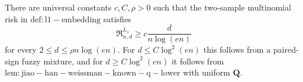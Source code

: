 There are universal constants \(c,C,\rho>0\) such that the two-sample multinomial risk in \(\mathrm{def:l1-embedding}\) satisfies
\[
 \mathfrak R^{L_1}_{n,d}\ge c\frac{d}{n\log(en)}
\]
for every \(2\le d\le\rho n\log(en)\).  For \(d\le C\log^2(en)\) this follows from a paired-sign fuzzy mixture, and for \(d\ge C\log^2(en)\) it follows from \(\mathrm{lem:jiao-han-weissman-known-q-lower}\) with uniform \(\mathbf Q\).